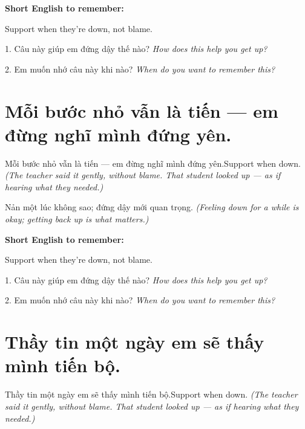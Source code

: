 \begin{ghinhoanh}
\textbf{Short English to remember:}

Support when they're down, not blame.

\end{ghinhoanh}

\begin{tuhocnhanh}
1. Câu này giúp em đứng dậy thế nào? \textit{How does this help you get up?}

2. Em muốn nhớ câu này khi nào? \textit{When do you want to remember this?}
\end{tuhocnhanh}
\ngancach


\section{Mỗi bước nhỏ vẫn là tiến — em đừng nghĩ mình đứng yên.}
\begin{truyen}{Mỗi bước nhỏ vẫn là tiến — em đừng nghĩ mình đứng yên.}{Support when down.}
\textit{(The teacher said it gently, without blame. That student looked up — as if hearing what they needed.)}
\end{truyen}

\begin{baihoc}
Nản một lúc không sao; đứng dậy mới quan trọng.
\textit{(Feeling down for a while is okay; getting back up is what matters.)}
\end{baihoc}

\begin{ghinhoanh}
\textbf{Short English to remember:}

Support when they're down, not blame.

\end{ghinhoanh}

\begin{tuhocnhanh}
1. Câu này giúp em đứng dậy thế nào? \textit{How does this help you get up?}

2. Em muốn nhớ câu này khi nào? \textit{When do you want to remember this?}
\end{tuhocnhanh}
\ngancach


\section{Thầy tin một ngày em sẽ thấy mình tiến bộ.}
\begin{truyen}{Thầy tin một ngày em sẽ thấy mình tiến bộ.}{Support when down.}
\textit{(The teacher said it gently, without blame. That student looked up — as if hearing what they needed.)}
\end{truyen}

